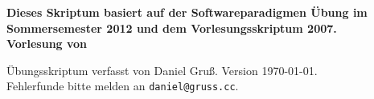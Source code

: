 
\thispagestyle{empty}

\begin{center}
\vspace*{5cm}
\huge{\textbf{\titel}}

\vspace*{1cm}

\large{\textbf{Dieses Skriptum basiert auf der Softwareparadigmen Übung im Sommersemester 2012 und dem Vorlesungsskriptum 2007.\\Vorlesung von \vortragender}}

\vfill

Übungsskriptum verfasst von Daniel Gruß. Version \today. \\
Fehlerfunde bitte melden an \verb|daniel@gruss.cc|.
\end{center}

\tableofcontents

